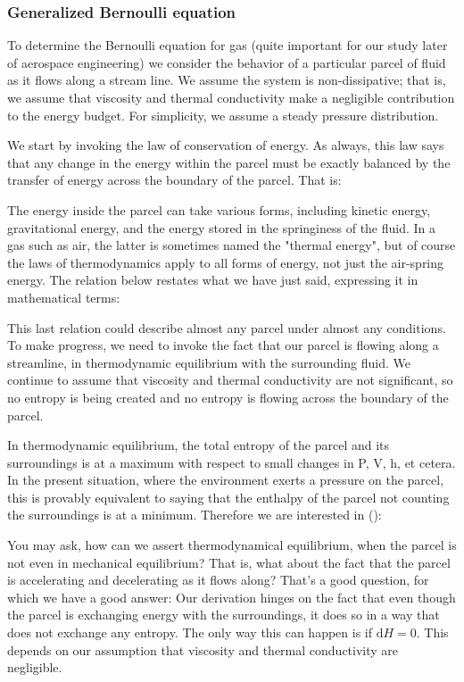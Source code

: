 	\pagebreak
	\subsubsection{Generalized Bernoulli equation}	
	To determine the Bernoulli equation for gas (quite important for our study later of aerospace engineering) we consider the behavior of a particular parcel of fluid as it flows along a stream line. We assume the system is non-dissipative; that is, we assume that viscosity and thermal conductivity make a negligible contribution to the energy budget. For simplicity, we assume a steady pressure distribution.
	
	We start by invoking the law of conservation of energy. As always, this law says that any change in the energy within the parcel must be exactly balanced by the transfer of energy across the boundary of the parcel. That is:
	
	The energy inside the parcel can take various forms, including kinetic energy, gravitational energy, and the energy stored in the springiness of the fluid. In a gas such as air, the latter is sometimes named the "thermal energy", but of course the laws of thermodynamics apply to all forms of energy, not just the air-spring energy. The relation below restates what we have just said, expressing it in mathematical terms:
	
	This last relation could describe almost any parcel under almost any conditions. To make progress, we need to invoke the fact that our parcel is flowing along a streamline, in thermodynamic equilibrium with the surrounding fluid. We continue to assume that viscosity and thermal conductivity are not significant, so no entropy is being created and no entropy is flowing across the boundary of the parcel.
	
	In thermodynamic equilibrium, the total entropy of the parcel and its surroundings is at a maximum with respect to small changes in P, V, h, et cetera. In the present situation, where the environment exerts a pressure on the parcel, this is provably equivalent to saying that the enthalpy of the parcel not counting the surroundings is at a minimum. Therefore we are interested in ():
	
	You may ask, how can we assert thermodynamical equilibrium, when the parcel is not even in mechanical equilibrium? That is, what about the fact that the parcel is accelerating and decelerating as it flows along? That's a good question, for which we have a good answer: Our derivation hinges on the fact that even though the parcel is exchanging energy with the surroundings, it does so in a way that does not exchange any entropy. The only way this can happen is if $\mathrm{d}H=0$. This depends on our assumption that viscosity and thermal conductivity are negligible.
	
